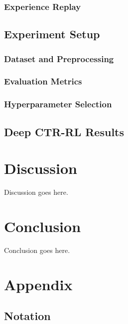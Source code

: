 \documentclass{mldsmsc}
\begin{document}
\subsection{Experience Replay}

\section{Experiment Setup}

\subsection{Dataset and Preprocessing}

\subsection{Evaluation Metrics}

\subsection{Hyperparameter Selection}

\section{Deep CTR-RL Results}

\chapter{Discussion}
\label{chap:discussion}

Discussion goes here.

\chapter{Conclusion}


Conclusion goes here. 





\clearpage
\renewcommand*{\thepage}{A\arabic{page}}

\appendix
%
\chapter{Appendix}

\section{Notation}
\label{app:notation}
\end{document}
